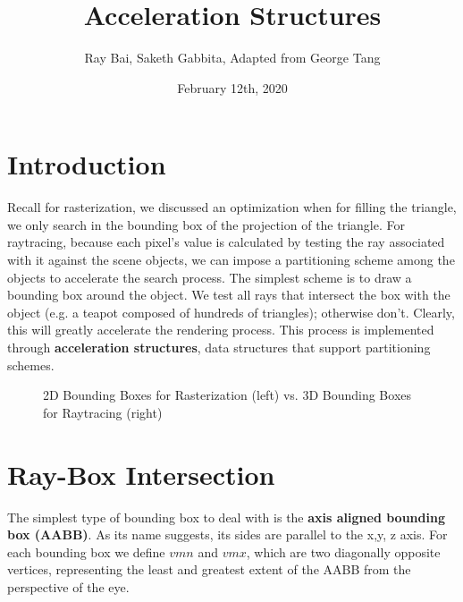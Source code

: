 \documentclass{article}
\title{Acceleration Structures}
\author{Ray Bai, Saketh Gabbita, Adapted from George Tang}
\date{February 12th, 2020}
\begin{document}
\maketitle

\section{Introduction}
Recall for rasterization, we discussed an optimization when for filling the triangle, we only search in the bounding box of the projection of the triangle. For raytracing, because each pixel's value is calculated by testing the ray associated with it against the scene objects, we can impose a partitioning scheme among the objects to accelerate the search process. The simplest scheme is to draw a bounding box around the object. We test all rays that intersect the box with the object (e.g. a teapot composed of hundreds of triangles); otherwise don't. Clearly, this will greatly accelerate the rendering process. This process is implemented through \textbf{acceleration structures}, data structures that support partitioning schemes.

\begin{figure}[!htbp]
 \centering
    \qquad
    \caption{2D Bounding Boxes for Rasterization (left) vs. 3D Bounding Boxes for Raytracing (right)}%
    \label{fig:example}%
\end{figure}

\section{Ray-Box Intersection}
The simplest type of bounding box to deal with is the \textbf{axis aligned bounding box (AABB)}. As its name suggests, its sides are parallel to the x,y, z axis. For each bounding box we define $vmn$ and $vmx$, which are two diagonally opposite vertices, representing the least and greatest extent of the AABB from the perspective of the eye. 
\end{document}
